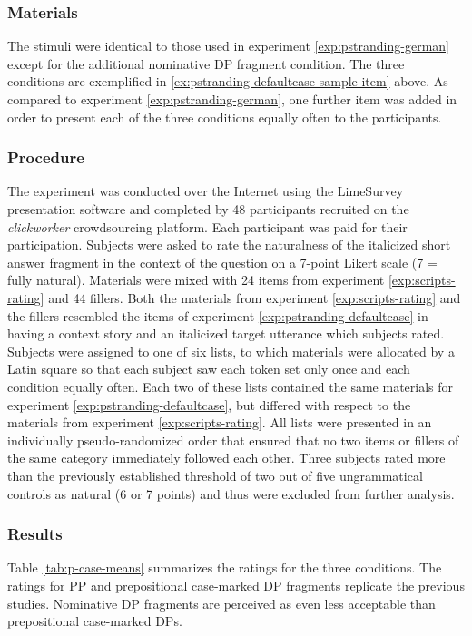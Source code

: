 \largerpage[2]
\subsubsection{Materials}
The stimuli were identical to those used in experiment \ref{exp:pstranding-german} except for the additional nominative DP fragment condition. The three conditions are exemplified in \ref{ex:pstranding-defaultcase-sample-item} above. As compared to experiment \ref{exp:pstranding-german}, one further item was added in order to present each of the three conditions equally often to the participants.

\subsubsection{Procedure}
The experiment was conducted over the Internet using the LimeSurvey presentation software and completed by 48 participants recruited on the \textit{clickworker} crowdsourcing platform. Each participant was paid  for their participation. Subjects were asked to rate the naturalness of the italicized short answer fragment in the context of the question on a 7-point Likert scale (7 = fully natural). Materials were mixed with 24 items from experiment \ref{exp:scripts-rating} and 44 fillers. Both the materials from experiment \ref{exp:scripts-rating} and the fillers resembled the items of experiment \ref{exp:pstranding-defaultcase} in having a context story and an italicized target utterance which subjects rated. Subjects were assigned to one of six lists, to which materials were allocated by a Latin square so that each subject saw each token set only once and each condition equally often. Each two of these lists contained the same materials for experiment \ref{exp:pstranding-defaultcase}, but differed with respect to the materials from experiment \ref{exp:scripts-rating}. All lists were presented in an individually pseudo-randomized order that ensured that no two items or fillers of the same category immediately followed each other. Three subjects rated more than the previously established threshold of two out of five ungrammatical controls as natural (6 or 7 points) and thus were excluded from further analysis.

\subsubsection{Results} 
Table \ref{tab:p-case-means} summarizes the ratings for the three conditions. The ratings for PP and prepositional case-marked DP fragments replicate the previous studies. Nominative DP fragments are perceived as even less acceptable than prepositional case-marked DPs.

